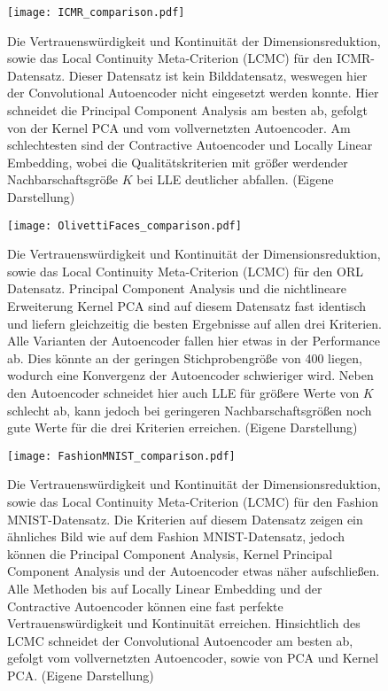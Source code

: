 \begin{figure}[ht]
	\begin{center}
		\texttt{[image: ICMR\_comparison.pdf]}
	\end{center}
	\caption[Qualitätskriterien für den ICMR-Datensatz]{Die Vertrauenswürdigkeit und Kontinuität der Dimensionsreduktion, sowie das Local Continuity Meta-Criterion (LCMC) für den ICMR-Datensatz. Dieser Datensatz ist kein Bilddatensatz, weswegen hier der Convolutional Autoencoder nicht eingesetzt werden konnte. Hier schneidet die Principal Component Analysis am besten ab, gefolgt von der Kernel PCA und vom vollvernetzten Autoencoder. Am schlechtesten sind der Contractive Autoencoder und Locally Linear Embedding, wobei die Qualitätskriterien mit größer werdender Nachbarschaftsgröße $K$ bei LLE deutlicher abfallen. (Eigene Darstellung)}
	\label{fig:ICMRMetrics}
\end{figure}

\begin{figure}[ht]
	\begin{center}
		\texttt{[image: OlivettiFaces\_comparison.pdf]}
	\end{center}
	\caption[Qualitätskriterien für den ORL-Datensatz]{Die Vertrauenswürdigkeit und Kontinuität der Dimensionsreduktion, sowie das Local Continuity Meta-Criterion (LCMC) für den ORL Datensatz. Principal Component Analysis und die nichtlineare Erweiterung Kernel PCA sind auf diesem Datensatz fast identisch und liefern gleichzeitig die besten Ergebnisse auf allen drei Kriterien. Alle Varianten der Autoencoder fallen hier etwas in der Performance ab. Dies könnte an der geringen Stichprobengröße von 400 liegen, wodurch eine Konvergenz der Autoencoder schwieriger wird. Neben den Autoencoder schneidet hier auch LLE für größere Werte von $K$ schlecht ab, kann jedoch bei geringeren Nachbarschaftsgrößen noch gute Werte für die drei Kriterien erreichen. (Eigene Darstellung)}
	\label{fig:OlivettiFacesMetrics}
\end{figure}

\begin{figure}[ht]
	\begin{center}
		\texttt{[image: FashionMNIST\_comparison.pdf]}
	\end{center}
	\caption[Qualitätskriterien für den Fashion MNIST-Datensatz]{Die Vertrauenswürdigkeit und Kontinuität der Dimensionsreduktion, sowie das Local Continuity Meta-Criterion (LCMC) für den Fashion MNIST-Datensatz. Die Kriterien auf diesem Datensatz zeigen ein ähnliches Bild wie auf dem Fashion MNIST-Datensatz, jedoch können die Principal Component Analysis, Kernel Principal Component Analysis und der Autoencoder etwas näher aufschließen. Alle Methoden bis auf Locally Linear Embedding und der Contractive Autoencoder können eine fast perfekte Vertrauenswürdigkeit und Kontinuität erreichen. Hinsichtlich des LCMC schneidet der Convolutional Autoencoder am besten ab, gefolgt vom vollvernetzten Autoencoder, sowie von PCA und Kernel PCA. (Eigene Darstellung)}
	\label{fig:FashionMNISTMetrics}
\end{figure}

